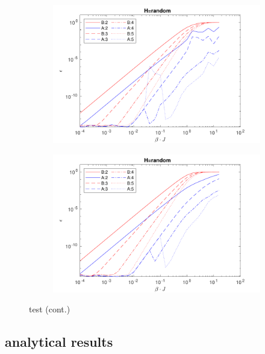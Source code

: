 \begin{figure}[H]\ContinuedFloat
    \begin{subfigure}[]{\textwidth}
        \includegraphics[width=\textwidth]{Figuren/benchmarking/rand_03.pdf}
    \end{subfigure}

    \begin{subfigure}[]{\textwidth}
        \includegraphics[width=\textwidth]{Figuren/benchmarking/rand_04.pdf}
    \end{subfigure}
    \caption{test (cont.) }
    \label{fig:benchmark:Random}
\end{figure}





\subsection{analytical results}